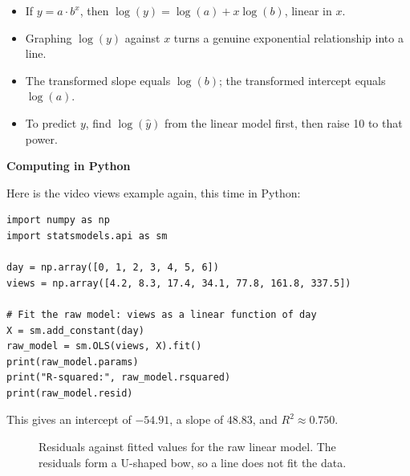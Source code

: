 \begin{itemize}
    \item If $y = a \cdot b^x$, then $\log(y) = \log(a) + x\log(b)$, linear in $x$.
    \item Graphing $\log(y)$ against $x$ turns a genuine exponential relationship into a line.
    \item The transformed slope equals $\log(b)$; the transformed intercept equals $\log(a)$.
    \item To predict $y$, find $\log(\hat{y})$ from the linear model first, then raise 10 to that power.
\end{itemize}

\textbf{Computing in Python}

Here is the video views example again, this time in Python:

\begin{verbatim}
import numpy as np
import statsmodels.api as sm

day = np.array([0, 1, 2, 3, 4, 5, 6])
views = np.array([4.2, 8.3, 17.4, 34.1, 77.8, 161.8, 337.5])

# Fit the raw model: views as a linear function of day
X = sm.add_constant(day)
raw_model = sm.OLS(views, X).fit()
print(raw_model.params)
print("R-squared:", raw_model.rsquared)
print(raw_model.resid)
\end{verbatim}

This gives an intercept of $-54.91$, a slope of $48.83$, and $R^2 \approx 0.750$. 

\begin{figure}[H]
    \centering
    \caption{Residuals against fitted values for the raw linear model. The residuals form a U-shaped bow, so a line does not fit the data.}
    \label{fig:logt-resid-raw}
\end{figure}

